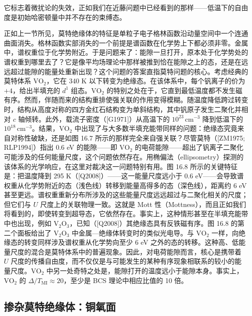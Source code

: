 它标志着微扰论的失效，正如我们在近藤问题中已经看到的那样——低温下的自由度是初始哈密顿量中并不存在的束缚态。

正如上一节所见，莫特绝缘体的特征是单粒子电子格林函数沿动量空间中一个连通曲面消失。格林函数实部消失的一个前提是谱函数在化学势上下都必须非零。金属中，谱权重位于化学势附近。于是问题来了：能隙一旦打开，原本处于化学势处的谱权重到哪里去了？它是像平均场理论中那样被推到恰在能隙之上的态，还是在远远超过能隙的能量处重新出现？这个问题的答案直指莫特问题的核心。考虑经典的莫特体系 $\mathrm{VO}_2$，它在 340 K 以下转变为绝缘态。在该体系中，每个钒离子的价为 $+4$，给出半填充的 $d^{1}$ 组态。$\mathrm{VO}_2$ 的特别之处在于，它直到最低温度都不发生磁有序。然而，伴随而来的结构重排使强关联的作用变得模糊。随温度降低跨过转变时，结构从高度对称的四方金红石结构变为单斜结构，其中钒原子发生二聚化并相对 $c$ 轴倾转。此外，载流子密度（[G1971]）从高温下的 $10^{23}\,\mathrm{cm}^{-3}$ 降到低温下的 $10^{18}\,\mathrm{cm}^{-3}$。结果，$\mathrm{VO}_2$ 中出现了与大多数半填充能带同样的问题：绝缘态究竟来自对称性破缺，还是如图 16.7 所示的那样完全来自强关联？尽管莫特（[ZM1975; RLP1994]）指出 0.6 eV 的能隙——即 $\mathrm{VO}_2$ 的电荷能隙——超出了钒离子二聚化可能涉及的任何能量尺度，这个问题依然存在。用椭偏法（ellipsometry）探测的该体系的光学响应，在这里对裁决这一问题特别有用。图 16.8 所示的关键特征是：把温度降到 295 K（[Q2008]）——这一能量尺度远小于 0.6 eV——会导致谱权重从化学势附近的态（浅色线）转移到能量高得多的态（深色线），距离约 6 eV 甚至更远。谱权重重新分布所涉及的这些能量尺度远远超过与二聚化相关的尺度；但它们与 $U$ 尺度上的关联物理一致。这就是 Mott 性（Mottness），而且正如我们将看到的，即使转变到超导态，它依然存在。事实上，这种情形甚至在半填充能带中也出现，例如 $\mathrm{V}_2\mathrm{O}_3$，已知（[Q2008]）其绝缘态具有反铁磁有序。图 16.8 的第二个面板给出了 $\mathrm{V}_2\mathrm{O}_3$ 中金属—绝缘体转变时的类似光电导。与 $\mathrm{VO}_2$ 一样，向绝缘态的转变同样涉及谱权重从化学势向至少 6 eV 之外的态的转移。这种高、低能量尺度的混合是莫特体系中的普遍现象。因此，对电荷能隙而言，核心是携带着 $U$ 尺度的传播自由度，而不仅仅是与可能发生的某种有序现象相联系的较小的能量尺度。$\mathrm{VO}_2$ 中另一处奇特之处是，能隙打开的温度远小于能隙本身。事实上，$\mathrm{VO}_2$ 的 $\Delta/T_{\mathrm{MI}}\approx 20$，至少是 BCS 理论中相应比值的 10 倍。

\subsection{掺杂莫特绝缘体：铜氧面}


